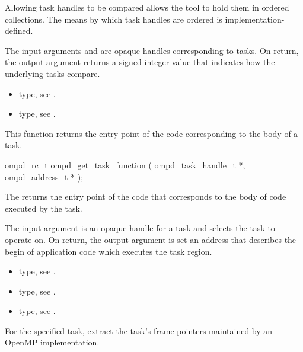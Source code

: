 Allowing task handles to be compared allows the tool to hold them in ordered collections.
The means by which task handles are ordered is implementation-defined.

\argdesc
The input arguments  and  are opaque handles
corresponding to tasks.
On return, the output argument   returns a signed
integer value that indicates how the underlying tasks compare.

\crossreferences
\begin{itemize}
	\item {} type, see .
	\item {} type, see .
\end{itemize}



\label{subsubsubsec:ompd_get_task_function}
\summary
This function returns the entry point of the code corresponding to the body of a task.
\format
\begin{cspecific}
\begin{ompSyntax}
ompd_rc_t ompd_get_task_function (
  ompd_task_handle_t *,
  ompd_address_t *
);
\end{ompSyntax}
\end{cspecific}

\descr
The  returns the entry point of the code
that corresponds to the body of code executed by the task.

\argdesc
The input argument  is an opaque handle for a task and selects the task to operate on.
On return, the output argument  is set an address that describes the begin of 
application
code which executes the task region.

\crossreferences
\begin{itemize}
	\item {} type, see .
	\item {} type, see .
	\item {} type, see .
\end{itemize}


%
\label{subsubsubsec:ompd_get_task_frame}
\summary
For the specified task, extract the task's frame pointers maintained by an OpenMP implementation.

